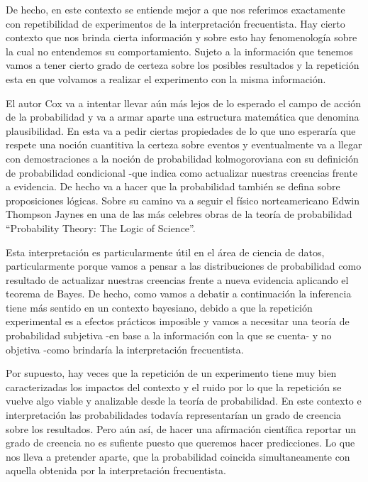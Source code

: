 De hecho, en este contexto se entiende mejor a que nos referimos exactamente con repetibilidad de experimentos de la interpretación frecuentista. Hay cierto contexto que nos brinda cierta información y sobre esto hay fenomenología sobre la cual no entendemos su comportamiento. Sujeto a la información que tenemos vamos a tener cierto grado de certeza sobre los posibles resultados y la repetición esta en que volvamos a realizar el experimento con la misma información. 

El autor Cox va a intentar llevar aún más lejos de lo esperado el campo de acción de la probabilidad y va a armar aparte una estructura matemática que denomina plausibilidad. En esta va a pedir ciertas propiedades de lo que uno esperaría que respete una noción cuantitiva la certeza sobre eventos y eventualmente va a llegar con demostraciones a la noción de probabilidad kolmogoroviana con su definición de probabilidad condicional -que indica como actualizar nuestras creencias frente a evidencia. De hecho va a hacer que la probabilidad también se defina sobre proposiciones lógicas\cite{cox1961algebra}. Sobre su camino va a seguir el físico norteamericano Edwin Thompson Jaynes en una de las más celebres obras de la teoría de probabilidad ``Probability Theory: The Logic of Science''\cite{jaynes2003probability}.

Esta interpretación es particularmente útil en el área de ciencia de datos, particularmente porque vamos a pensar a las distribuciones de probabilidad como resultado de actualizar nuestras creencias frente a nueva evidencia aplicando el teorema de Bayes. De hecho, como vamos a debatir a continuación la inferencia tiene más sentido en un contexto bayesiano, debido a que la repetición experimental es a efectos prácticos imposible y vamos a necesitar una teoría de probabilidad subjetiva -en base a la información con la que se cuenta- y no objetiva -como brindaría la interpretación frecuentista.

Por supuesto, hay veces que la repetición de un experimento tiene muy bien caracterizadas los impactos del contexto y el ruido por lo que la repetición se vuelve algo viable y analizable desde la teoría de probabilidad. En este contexto e interpretación las probabilidades todavía representarían un grado de creencia sobre los resultados. Pero aún así, de hacer una afírmación científica reportar un grado de creencia no es sufiente puesto que queremos hacer predicciones. Lo que nos lleva a pretender aparte, que la probabilidad coincida simultaneamente con aquella obtenida por la interpretación frecuentista.

